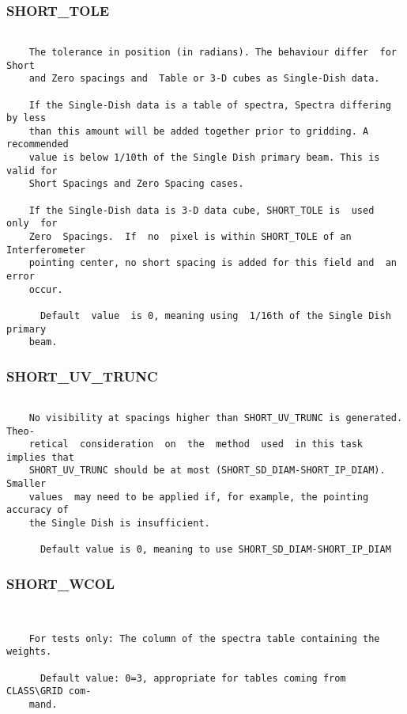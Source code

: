 \subsubsection{SHORT\_TOLE}
\begin{verbatim}

    The tolerance in position (in radians). The behaviour differ  for  Short
    and Zero spacings and  Table or 3-D cubes as Single-Dish data.

    If the Single-Dish data is a table of spectra, Spectra differing by less
    than this amount will be added together prior to gridding. A recommended
    value is below 1/10th of the Single Dish primary beam. This is valid for
    Short Spacings and Zero Spacing cases.

    If the Single-Dish data is 3-D data cube, SHORT_TOLE is  used  only  for
    Zero  Spacings.  If  no  pixel is within SHORT_TOLE of an Interferometer
    pointing center, no short spacing is added for this field and  an  error
    occur.

      Default  value  is 0, meaning using  1/16th of the Single Dish primary
    beam.

\end{verbatim}
\subsubsection{SHORT\_UV\_TRUNC}
\begin{verbatim}

    No visibility at spacings higher than SHORT_UV_TRUNC is generated. Theo-
    retical  consideration  on  the  method  used  in this task implies that
    SHORT_UV_TRUNC should be at most (SHORT_SD_DIAM-SHORT_IP_DIAM).  Smaller
    values  may need to be applied if, for example, the pointing accuracy of
    the Single Dish is insufficient.

      Default value is 0, meaning to use SHORT_SD_DIAM-SHORT_IP_DIAM

\end{verbatim}
\subsubsection{SHORT\_WCOL}
\begin{verbatim}


    For tests only: The column of the spectra table containing the weights.

      Default value: 0=3, appropriate for tables coming from CLASS\GRID com-
    mand.

\end{verbatim}
